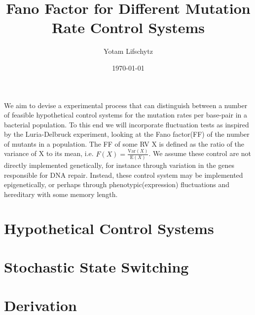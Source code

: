 \documentclass{article}
\title{\textbf{Fano Factor for Different Mutation Rate Control Systems}}
\date{\today}
\author{Yotam Lifschytz}
\begin{document}
\maketitle

We aim to devise a experimental process that can distinguish between a number of feasible hypothetical control systems for the mutation rates per base-pair in a bacterial population.
To this end we will incorporate fluctuation tests as inspired by the Luria-Delbruck experiment, looking at the Fano factor(FF) of the number of mutants in a population.
The FF of some RV X is defined as the ratio of the variance of X to its mean, i.e. $F(X) = \frac{\text{Var}(X)}{\text{E}(X)}$.
We assume these control are not directly implemented genetically, for instance through variation in the genes responsible for DNA repair.
Instead, these control system may be implemented epigenetically, or perhaps through phenotypic(expression) fluctuations and hereditary with some memory length.

\section{Hypothetical Control Systems}\label{sec:hypothetical-control-systems}


\section{Stochastic State Switching}\label{sec:sss}


\section{Derivation}\label{sec:derivation}

\end{document}

